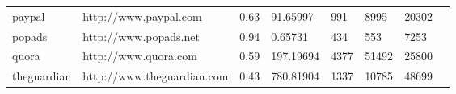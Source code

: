 \begin{table}[]
{\begin{tabular}{llllllll}
paypal                                & http://www.paypal.com            & 0.63                                                                                                    & 91.65997                                                                                              & 991                                                                                & 8995                                                                              & 20302                                                                                    &                                                                                             \\
popads                                & http://www.popads.net            & 0.94                                                                                                    & 0.65731                                                                                               & 434                                                                                & 553                                                                               & 7253                                                                                     &                                                                                             \\
quora                                 & http://www.quora.com             & 0.59                                                                                                    & 197.19694                                                                                             & 4377                                                                               & 51492                                                                             & 25800                                                                                    &                                                                                             \\
theguardian                           & http://www.theguardian.com       & 0.43                                                                                                    & 780.81904                                                                                             & 1337                                                                               & 10785                                                                             & 48699                                                                                    &                                                                                             \\

\end{tabular}}
\end{table}
